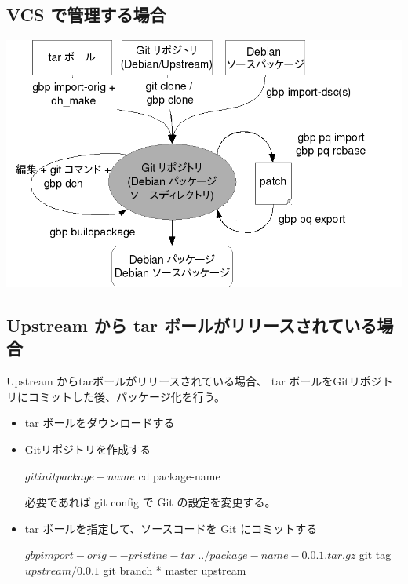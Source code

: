 \documentclass[mingoth,a4paper]{jsarticle}
\begin{document}
\subsection{VCS で管理する場合}
\begin{center}
\includegraphics[width=0.8\hsize]{image201509/gbp-images1_mono.png}
\end{center}

\subsection{Upstream から tar ボールがリリースされている場合}

Upstream からtarボールがリリースされている場合、
tar ボールをGitリポジトリにコミットした後、パッケージ化を行う。


\begin{itemize}
\item tar ボールをダウンロードする


\item Gitリポジトリを作成する

\begin{commandline}
$ git init package-name
$ cd package-name
\end{commandline}

必要であれば git config で Git の設定を変更する。
\end{itemize}

\begin{itemize}
\item tar ボールを指定して、ソースコードを Git にコミットする

\begin{commandline}
$ gbp import-orig --pristine-tar \
	../package-name-0.0.1.tar.gz
$ git tag 
$ upstream/0.0.1
$ git branch
* master
  upstream
\end{commandline}
\end{itemize}
\end{document}
